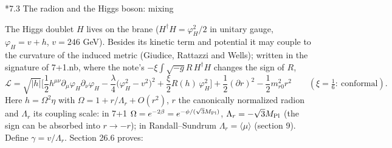 \documentclass[10pt,a4paper]{article}
\makeatletter
\renewcommand\subsection{\@startsection{subsection}{2}{\z@}{-3.25ex\@plus -1ex \@minus -.2ex}{1.5ex \@plus .2ex}{\normalfont\large\bfseries\raggedright}}
\makeatother
\begin{document}
\subsection*{7.3 The radion and the Higgs boson: mixing}
The Higgs doublet $H$ lives on the brane ($H^\dagger H=\varphi_H^2/2$ in unitary gauge, $\varphi_H=v+h$, $v=246$ GeV). Besides its kinetic term and potential it may couple to the curvature of the induced metric (Giudice, Rattazzi and Wells); written in the signature of 7+1.nb, where the note’s $-\xi\int\sqrt{-g}R\,H^\dagger H$ changes the sign of $R$,
\begin{equation*}
\mathcal L=\sqrt{|h|}\Big[\frac12h^{\mu\nu}\partial_\mu\varphi_H\partial_\nu\varphi_H-\frac\lambda4\big(\varphi_H^2-v^2\big)^2+\frac\xi2R(h)\,\varphi_H^2\Big]+\frac12(\partial r)^2-\frac12m_{r0}^2r^2 \qquad(\xi=\tfrac16:\ \text{conformal}).
\end{equation*}
Here $h=\Omega^2\eta$ with $\Omega=1+r/\Lambda_r+O(r^2)$, $r$ the canonically normalized radion and $\Lambda_r$ its coupling scale: in 7+1 $\Omega=e^{-2\beta}=e^{-\phi/(\sqrt3M_{\rm Pl})}$, $\Lambda_r=-\sqrt3M_{\rm Pl}$ (the sign can be absorbed into $r\to-r$); in Randall–Sundrum $\Lambda_r=\langle\mu\rangle$ (section 9). Define $\gamma=v/\Lambda_r$. Section 26.6 proves:
\end{document}
